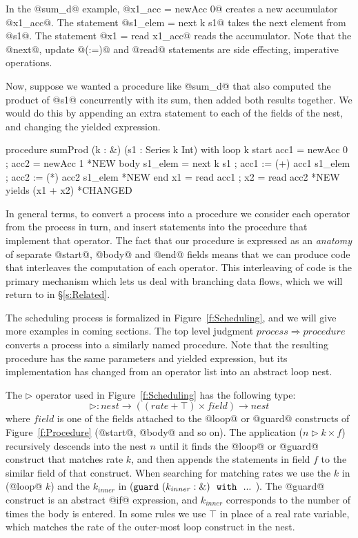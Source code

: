In the @sum_d@ example, @x1_acc = newAcc 0@ creates a new accumulator @x1_acc@. The statement @s1_elem = next k s1@ takes the next element from @s1@. The statement @x1 = read x1_acc@ reads the accumulator. Note that the @next@, update @(:=)@ and @read@ statements are side effecting, imperative operations. 

Now, suppose we wanted a procedure like @sum_d@ that also computed the product of @s1@ concurrently with its sum, then added both results together. We would do this by appending an extra statement to each of the fields of the nest, and changing the yielded expression.

\begin{code}
procedure sumProd (k : &) (s1 : Series k Int)
 with loop k
      start { acc1      = newAcc 0
            ; acc2      = newAcc 1 }          *NEW
      body  { s1_elem   = next k s1
            ; acc1     := (+) acc1 s1_elem
            ; acc2     := (*) acc2 s1_elem }  *NEW
      end   { x1        = read acc1
            ; x2        = read acc2 }         *NEW
 yields (x1 + x2)                         *CHANGED
\end{code}

In general terms, to convert a process into a procedure we consider each operator from the process in turn, and insert statements into the procedure that implement that operator. The fact that our procedure is expressed as an \emph{anatomy} of separate @start@, @body@ and @end@ fields means that we can produce code that interleaves the computation of each operator. This interleaving of code is the primary mechanism which lets us deal with branching data flows, which we will return to in \S\ref{s:Related}. 

The scheduling process is formalized in Figure~\ref{f:Scheduling}, and we will give more examples in coming sections. The top level judgment $process \Rightarrow procedure$ converts a process into a similarly named procedure. Note that the resulting procedure has the same parameters and yielded expression, but its implementation has changed from an operator list into an abstract loop nest.

The $\rhd$ operator used in Figure~\ref{f:Scheduling} has the following type:
%
\[ \rhd : nest \to ((rate + \top) \times field) \to nest \]
%
where $field$ is one of the fields attached to the @loop@ or @guard@ constructs of Figure~\ref{f:Procedure} (@start@, @body@ and so on). The application ($n \rhd k \times f$) recursively descends into the nest $n$ until it finds the @loop@ or @guard@ construct that matches rate $k$, and then appends the statements in field $f$ to the similar field of that construct. When searching for matching rates we use the $k$ in (@loop@ $k$) and the $k_{inner}$ in ($\tt{guard}~ (k_{inner} : \&)~~ \tt{with}~~ ...$ ). The @guard@ construct is an abstract @if@ expression, and $k_{inner}$ corresponds to the number of times the body is entered. In some rules we use $\top$ in place of a real rate variable, which matches the rate of the outer-most loop construct in the nest.


